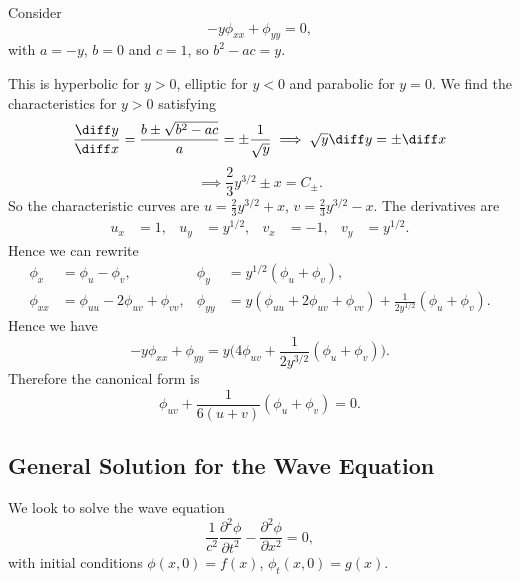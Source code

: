 \documentclass[12pt]{article}
\begin{document}
\begin{exbox}
	Consider
	\[
	-y \phi_{xx} + \phi_{yy} = 0
	,\]
	with $a = -y$, $b = 0$ and $c = 1$, so $b^2 - ac = y$.

	This is hyperbolic for $y > 0$, elliptic for $y < 0$ and parabolic for $y = 0$. We find the characteristics for $y > 0$ satisfying
	\[
		\frac{\diff y}{\diff x} = \frac{b \pm \sqrt{b^2 - ac}}{a} = \pm \frac{1}{\sqrt y} \implies \sqrt y \diff y = \pm \diff x
	\]
	\[
	 \implies \frac{2}{3} y^{3/2} \pm x = C_{\pm}
	.\]
	So the characteristic curves are $u = \frac{2}{3} y^{3/2} + x$, $v = \frac{2}{3} y^{3/2} - x$. The derivatives are
	\begin{align*}
		u_x &= 1, & u_y &= y^{1/2}, & v_x &= -1, & v_y &= y^{1/2}.
	\end{align*}
	Hence we can rewrite
	\begin{align*}
		\phi_x &= \phi_u - \phi_v, & \phi_y &= y^{1/2}(\phi_u + \phi_v), \\
		\phi_{xx} &= \phi_{uu} - 2 \phi_{uv} + \phi_{vv}, & \phi_{yy} &= y(\phi_{uu} + 2 \phi_{uv} + \phi_{vv}) + \frac{1}{2y^{1/2}}(\phi_u + \phi_v).
	\end{align*}
	Hence we have
	\[
		-y \phi_{xx} + \phi_{yy} = y\biggl(4 \phi_{uv} + \frac{1}{2y^{3/2}}(\phi_u + \phi_v) \biggr)
	.\]
	Therefore the canonical form is
	\[
		\phi_{uv} + \frac{1}{6(u+v)}(\phi_u + \phi_v) = 0
	.\]
\end{exbox}

\subsection{General Solution for the Wave Equation}%
\label{sub:general_solution_for_the_wave_equation}

We look to solve the wave equation
\[
\frac{1}{c^2} \frac{\partial^2 \phi}{\partial t^2} - \frac{\partial^2 \phi}{\partial x^2} = 0
,\]
with initial conditions $\phi(x, 0) = f(x)$, $\phi_t(x, 0) = g(x)$.
\end{document}
